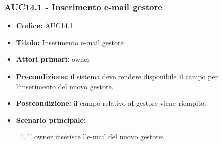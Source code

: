 \documentclass[casi-duso]{subfiles}
\begin{document}
\subsubsection{AUC14.1 - Inserimento e-mail gestore}%
\label{subsub:AUC14.1}
\begin{itemize}
  \item \textbf{Codice:} AUC14.1
  \item \textbf{Titolo:} Inserimento e-mail gestore
  \item \textbf{Attori primari:} owner
  \item \textbf{Precondizione:} il sistema deve rendere disponibile il campo per l'inserimento del nuovo gestore.
  \item \textbf{Postcondizione:} il campo relativo al gestore viene riempito.
  \item \textbf{Scenario principale:} 
  \begin{enumerate}
    \item l' owner inserisce l'e-mail del nuovo gestore;
  \end{enumerate}
\end{itemize}

\end{document}
